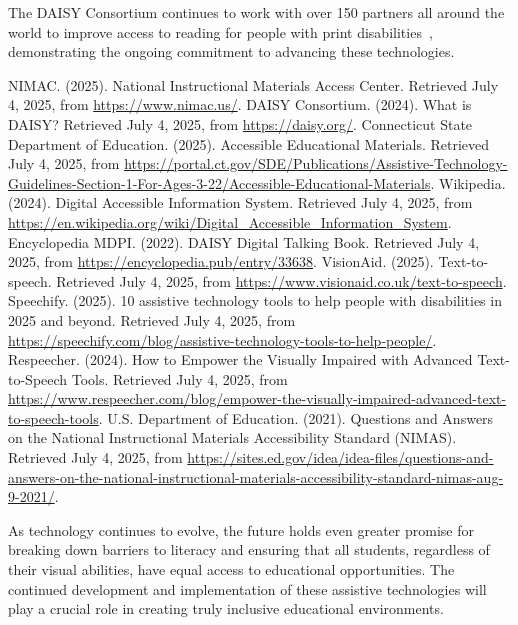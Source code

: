 The DAISY Consortium continues to work with over 150 partners all around the world to improve access to reading for people with print disabilities~\cite{DAISY2024}, demonstrating the ongoing commitment to advancing these technologies.

\begin{thebibliography}{99}
 NIMAC. (2025). National Instructional Materials Access Center. Retrieved July 4, 2025, from \url{https://www.nimac.us/}.
 DAISY Consortium. (2024). What is DAISY? Retrieved July 4, 2025, from \url{https://daisy.org/}.
 Connecticut State Department of Education. (2025). Accessible Educational Materials. Retrieved July 4, 2025, from \url{https://portal.ct.gov/SDE/Publications/Assistive-Technology-Guidelines-Section-1-For-Ages-3-22/Accessible-Educational-Materials}.
 Wikipedia. (2024). Digital Accessible Information System. Retrieved July 4, 2025, from \url{https://en.wikipedia.org/wiki/Digital_Accessible_Information_System}.
 Encyclopedia MDPI. (2022). DAISY Digital Talking Book. Retrieved July 4, 2025, from \url{https://encyclopedia.pub/entry/33638}.
 VisionAid. (2025). Text-to-speech. Retrieved July 4, 2025, from \url{https://www.visionaid.co.uk/text-to-speech}.
 Speechify. (2025). 10 assistive technology tools to help people with disabilities in 2025 and beyond. Retrieved July 4, 2025, from \url{https://speechify.com/blog/assistive-technology-tools-to-help-people/}.
 Respeecher. (2024). How to Empower the Visually Impaired with Advanced Text-to-Speech Tools. Retrieved July 4, 2025, from \url{https://www.respeecher.com/blog/empower-the-visually-impaired-advanced-text-to-speech-tools}.
 U.S. Department of Education. (2021). Questions and Answers on the National Instructional Materials Accessibility Standard (NIMAS). Retrieved July 4, 2025, from \url{https://sites.ed.gov/idea/idea-files/questions-and-answers-on-the-national-instructional-materials-accessibility-standard-nimas-aug-9-2021/}.
\end{thebibliography}

As technology continues to evolve, the future holds even greater promise for breaking down barriers to literacy and ensuring that all students, regardless of their visual abilities, have equal access to educational opportunities. The continued development and implementation of these assistive technologies will play a crucial role in creating truly inclusive educational environments.
